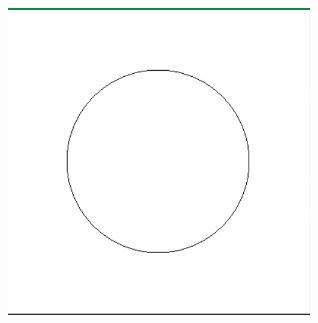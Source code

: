 \documentclass{scrartcl}
\begin{document}
\begin{enumerate}
\begin{center}
\includegraphics[width=8cm]{./2017-10-03-05.png}
\end{center}
\end{enumerate}
\end{document}
